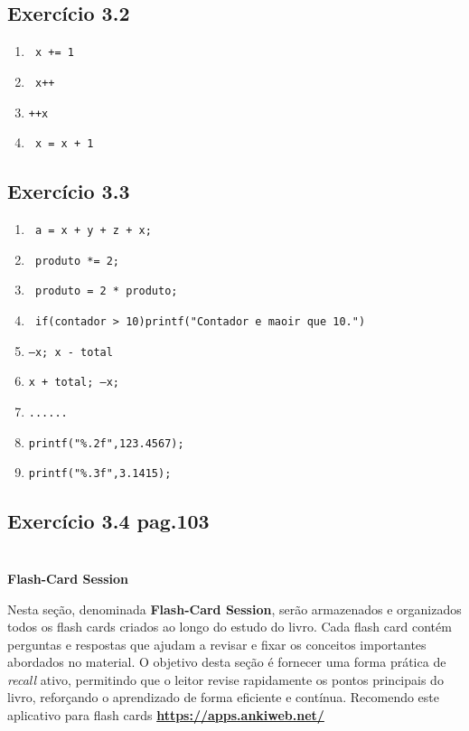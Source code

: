 \documentclass[a4paper,12pt]{article}
\begin{document}
\subsection*{Exercício 3.2}
\begin{enumerate}
    \item[] \texttt{ x += 1 }
    \item[] \texttt{ x++ }
    \item[] \texttt{++x}
    \item[] \texttt{ x = x + 1 }
\end{enumerate}
\subsection*{Exercício 3.3}
\begin{enumerate}
    \item[a] \texttt{ a = x + y + z + x;  }
    \item[b] \texttt{ produto *= 2; }
    \item[c] \texttt{ produto = 2 * produto; }
    \item[d] \texttt{ if(contador > 10){printf("Contador e maoir que 10.")}}
    \item[e] \texttt{--x; x - total }
    \item[f] \texttt{x + total; --x; }
    \item[g] \texttt{......}
    \item[h] \texttt{printf("\%.2f",123.4567);}
    \item[i] \texttt{printf("\%.3f",3.1415);}
\end{enumerate}
\subsection*{Exercício 3.4 pag.103}















\section*{}
\begin{center}
\Huge \textbf{Flash-Card Session}
\end{center}
\vspace{1em} %
\noindent
Nesta seção, denominada \textbf{Flash-Card Session}, serão armazenados e organizados todos os flash cards criados ao longo do estudo do livro. Cada flash card contém perguntas e respostas que ajudam a revisar e fixar os conceitos importantes abordados no material. 
O objetivo desta seção é fornecer uma forma prática de \textit{recall} ativo, permitindo que o leitor revise rapidamente os pontos principais do livro, reforçando o aprendizado de forma eficiente e contínua.
Recomendo este aplicativo para flash cards \textcolor{blue}{\textbf{\href{https://apps.ankiweb.net/}{https://apps.ankiweb.net/}}} 
\end{document}

